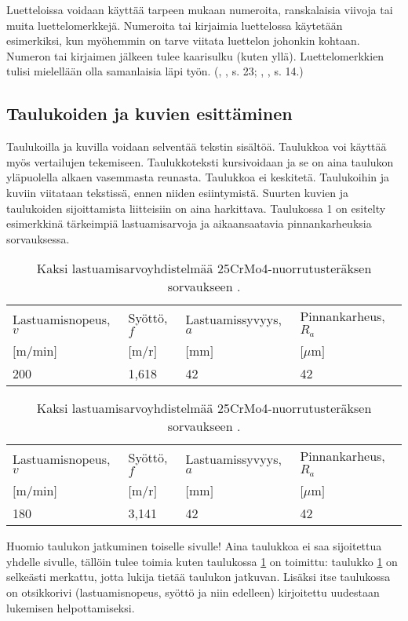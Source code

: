 \documentclass{LUT_pohja}[2016/03/09 LUT Dippa Pohja]
\begin{document}
Luetteloissa voidaan käyttää tarpeen mukaan numeroita, ranskalaisia viivoja tai muita 
luettelomerkkejä.  Numeroita  tai kirjaimia  luettelossa käytetään esimerkiksi,  kun 
myöhemmin on tarve viitata luettelon johonkin kohtaan. Numeron tai kirjaimen jälkeen 
tulee kaarisulku (kuten yllä). Luettelomerkkien tulisi mielellään olla samanlaisia läpi työn. (\citeauthor{Leino00}, \citeyear{Leino00}, s. 23; \citeauthor{Kauppinen01a}, \citeyear{Kauppinen01a}, s. 14.)
\subsection{Taulukoiden ja kuvien esittäminen}
Taulukoilla ja kuvilla voidaan selventää tekstin sisältöä. Taulukkoa voi käyttää myös 
vertailujen tekemiseen. Taulukkoteksti kursivoidaan ja se on aina taulukon yläpuolella alkaen vasemmasta reunasta. Taulukkoa ei keskitetä. Taulukoihin ja kuviin viitataan tekstissä, ennen niiden esiintymistä. \citep[s.98.]{Leino00} Suurten kuvien ja taulukoiden sijoittamista liitteisiin on aina harkittava. Taulukossa 1 on esitelty esimerkkinä tärkeimpiä lastuamisarvoja ja aikaansaatavia pinnankarheuksia sorvauksessa.
\begin{table}[htb]
\caption{Kaksi lastuamisarvoyhdistelmää 25CrMo4-nuorrutusteräksen sorvaukseen \citep[s. 34]{Varis97}.}
\begin{tabular}{|l|l|l|l|}
	\hline
  Lastuamisnopeus, $v$ & Syöttö, $f$  & Lastuamissyvyys, $a$ & Pinnankarheus, $R_{a}$\\
  $[$m/min$]$ & $[$m/r$]$ & $[$mm$]$ & $[\mu$m$]$\\ \hline
  200 & 1,618 & 42 & 42\\ \hline
\end{tabular}
\end{table}
\newpage

\addtocounter{table}{-1}%
\begin{table}[htb]
\caption{Kaksi lastuamisarvoyhdistelmää 25CrMo4-nuorrutusteräksen sorvaukseen \citep[s. 34]{Varis97}.}
	\label{table:Lastuamis}
\begin{tabular}{|l|l|l|l|}
	\hline
  Lastuamisnopeus, $v$ & Syöttö, $f$  & Lastuamissyvyys, $a$ & Pinnankarheus, $R_{a}$\\
  $[$m/min$]$ & $[$m/r$]$ & $[$mm$]$ & $[\mu$m$]$\\ \hline
  180 & 3,141 & 42 & 42\\ \hline
\end{tabular}
\end{table}
Huomio taulukon jatkuminen toiselle sivulle! Aina taulukkoa ei saa sijoitettua yhdelle 
sivulle, tällöin tulee toimia kuten taulukossa \ref{table:Lastuamis} on toimittu: taulukko \ref{table:Lastuamis} on selkeästi merkattu, jotta lukija tietää taulukon jatkuvan. Lisäksi itse taulukossa on otsikkorivi (lastuamisnopeus, syöttö ja niin edelleen) kirjoitettu uudestaan lukemisen helpottamiseksi.\par
\end{document}
